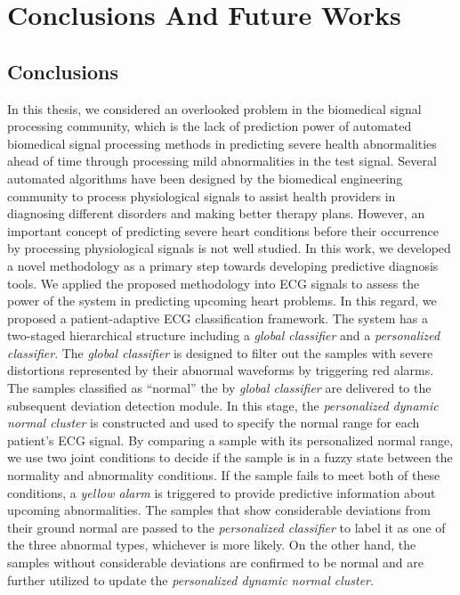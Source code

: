  \chapter{Conclusions And Future Works} \label{ch:Discussion And Resuls}
 
\section{Conclusions}
In this thesis, we considered an overlooked problem in the biomedical signal processing community, which is the lack of prediction power of automated biomedical signal processing methods in predicting severe health abnormalities ahead of time through processing mild abnormalities in the test signal. Several automated algorithms have been designed by the biomedical engineering community to process physiological signals to assist health providers in diagnosing different disorders and making better therapy plans. However, an important concept of predicting severe heart conditions before their occurrence by processing physiological signals is not well studied. In this work, we developed a novel methodology as a primary step towards developing predictive diagnosis tools. We applied the proposed methodology into ECG signals to assess the power of the system in predicting upcoming heart problems.  
In this regard, we proposed a patient-adaptive ECG classification framework. The system has a two-staged hierarchical structure including a \textit{global classifier} and a \textit{personalized classifier}. The \textit{global classifier} is designed to filter out the samples with severe distortions represented by their abnormal waveforms by triggering red alarms. The samples classified as ``normal'' the by \textit{global classifier} are delivered to the subsequent deviation detection module. In this stage, the \textit{personalized dynamic normal cluster} is constructed and used to specify the normal range for each patient's ECG signal. By comparing a sample with its personalized normal range, we use two joint conditions to decide if the sample is in a fuzzy state between the normality and abnormality conditions. If the sample fails to meet both of these conditions, a \textit{yellow alarm} is triggered to provide predictive information about upcoming abnormalities. The samples that show considerable deviations from their ground normal are passed to the \textit{personalized classifier} to label it as one of the three abnormal types, whichever is more likely. On the other hand, the samples without considerable deviations are confirmed to be normal and are further utilized to update the \textit{personalized dynamic normal cluster}.

